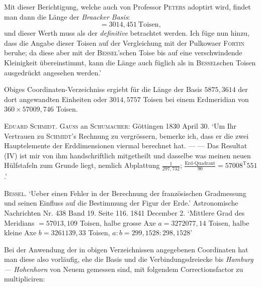 Mit dieser Berichtigung, welche auch von Professor \textsc{Peters} adoptirt wird, findet man dann die Länge der \textit{Braacker Basis}:
\[
=3014{,}451\ \text{Toisen},
\]
und dieser Werth muss als der \textit{definitive} betrachtet werden. Ich füge nun hinzu, dass die Angabe dieser Toisen auf der Vergleichung mit der Pulkowaer \textsc{Fortin} beruhe; da diese aber mit der \textsc{Bessel}’schen Toise bis auf eine verschwindende Kleinigkeit übereinstimmt, kann die Länge auch füglich als in \textsc{Bessel}schen Toisen ausgedrückt angesehen werden.’

Obiges Coordinaten-Verzeichniss ergiebt für die Länge der Basis \(5875{,}3614\) der dort angewandten Einheiten oder \(3014{,}5757\) Toisen bei einem Erdmeridian von \(360\times57009{,}746\) Toisen.

\textsc{Eduard Schmidt. Gauss} an \textsc{Schumacher}: Göttingen 1830 April 30. ‘Um Ihr Vertrauen zu \textsc{Schmidt}’s Rechnung zu vergrössern, bemerke ich, dass er die zwei Hauptelemente der Erddimensionen viermal berechnet hat. — — Das Resultat (IV) ist mir von ihm handschriftlich mitgetheilt und dasselbe was meinen neuen Hülfstafeln zum Grunde liegt, nemlich Abplattung \(\frac{1}{297{,}732}\); \(\frac{\text{Erd-Quadrant}}{90}=57008^{\mathrm{T}}551\).’

\textsc{Bessel}. ‘Ueber einen Fehler in der Berechnung der französischen Gradmessung und seinen Einfluss auf die Bestimmung der Figur der Erde.’ Astronomische Nachrichten Nr. 438 Band 19. Seite 116. 1841 December 2. ‘Mittlere Grad des Meridians \(=57013{,}109\) Toisen, halbe grosse Axe \(a=3272077{,}14\) Toisen, halbe kleine Axe \(b=3261139{,}33\) Toisen, \(a:b=299{,}1528:298{,}1528\)’

Bei der Anwendung der in obigen Verzeichnissen angegebenen Coordinaten hat man diese also vorläufig, ehe die Basis und die Verbindungsdreiecke bis \textit{Hamburg — Hohenhorn} von Neuem gemessen sind, mit folgendem Correctionsfactor zu multipliciren:
